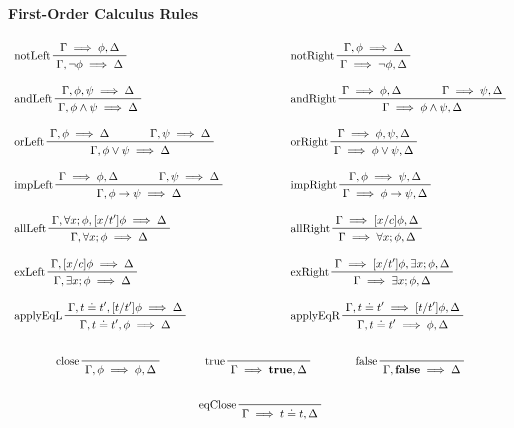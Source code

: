 \documentclass[a4paper, 11pt, accentcolor = tud3b]{tudreport}
\newcommand{\true}{\textbf{true}}
\newcommand{\false}{\textbf{false}}
\begin{document}
				\paragraph{First-Order Calculus Rules}
					\begin{gather*}
						\begin{array}{lcl}
							\prftree[l]{notLeft}{\Gamma \implies \phi, \Delta}{\Gamma, \lnot\phi \implies \Delta} &\quad\quad\quad\quad& \prftree[l]{notRight}{\Gamma, \phi \implies \Delta}{\Gamma \implies \lnot\phi, \Delta} \\\\
							\prftree[l]{andLeft}{\Gamma, \phi, \psi \implies \Delta}{\Gamma, \phi \land \psi \implies \Delta} && \prftree[l]{andRight}{\Gamma \implies \phi, \Delta}{\qquad}{\Gamma \implies \psi, \Delta}{\Gamma \implies \phi \land \psi, \Delta} \\\\
							\prftree[l]{orLeft}{\Gamma, \phi \implies \Delta}{\qquad}{\Gamma, \psi \implies \Delta}{\Gamma, \phi \lor \psi \implies \Delta} && \prftree[l]{orRight}{\Gamma \implies \phi, \psi, \Delta}{\Gamma \implies \phi \lor \psi, \Delta} \\\\
							\prftree[l]{impLeft}{\Gamma \implies \phi, \Delta}{\qquad}{\Gamma, \psi \implies \Delta}{\Gamma, \phi \to \psi \implies \Delta} && \prftree[l]{impRight}{\Gamma, \phi \implies \psi, \Delta}{\Gamma \implies \phi \to \psi, \Delta} \\\\
							\prftree[l]{allLeft}{\Gamma, \forall x; \phi, [x/t']\phi \implies \Delta}{\Gamma, \forall x; \phi \implies \Delta} && \prftree[l]{allRight}{\Gamma \implies [x/c]\phi, \Delta}{\Gamma \implies \forall x; \phi, \Delta} \\\\
							\prftree[l]{exLeft}{\Gamma, [x/c]\phi \implies \Delta}{\Gamma, \exists x; \phi \implies \Delta} && \prftree[l]{exRight}{\Gamma \implies [x/t']\phi, \exists x; \phi, \Delta}{\Gamma \implies \exists x; \phi, \Delta} \\\\
							\prftree[l]{applyEqL}{\Gamma, t \doteq t', [t/t']\phi \implies \Delta}{\Gamma, t \doteq t', \phi \implies \Delta} && \prftree[l]{applyEqR}{\Gamma, t \doteq t' \implies [t/t']\phi, \Delta}{\Gamma, t \doteq t' \implies \phi, \Delta}
						\end{array} \\\\
						\prftree[l]{close}{\Gamma, \phi \implies \phi, \Delta} \quad\quad\quad\quad \prftree[l]{true}{\Gamma \implies \true, \Delta} \quad\quad\quad\quad \prftree[l]{false}{\Gamma, \false \implies \Delta} \\\\
						\prftree[l]{eqClose}{\Gamma \implies t \doteq t, \Delta}
					\end{gather*}
\end{document}
